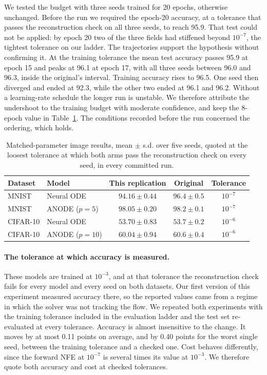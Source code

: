 We tested the budget with three seeds trained for 20 epochs, otherwise unchanged. Before the
run we required the epoch-20 accuracy, at a tolerance that passes the reconstruction check on
all three seeds, to reach 95.9. That test could not be applied: by epoch 20 two of the three
fields had stiffened beyond $10^{-7}$, the tightest tolerance on our ladder. The trajectories
support the hypothesis without confirming it. At the training tolerance the mean test accuracy
passes 95.9 at epoch 15 and peaks at 96.1 at epoch 17, with all three seeds between 96.0 and 96.3, inside the original's interval. Training accuracy
rises to 96.5. One seed then
diverged and ended at 92.3, while the other two ended at 96.1 and 96.2. Without a learning-rate
schedule the longer run is unstable. We therefore attribute the undershoot to the training
budget with moderate confidence, and keep the 8-epoch value in Table~\ref{tab:table1}. The conditions recorded before the run concerned the ordering, which holds.

\begin{table}[h]
  \centering
  \small
  \caption{Matched-parameter image results, mean $\pm$ s.d. over five seeds, quoted at the
           loosest tolerance at which both arms pass the reconstruction check on every seed,
           in every committed run.}
  \label{tab:table1}
  \begin{tabular}{@{}llccc@{}}
    \toprule
    Dataset & Model & This replication & Original & Tolerance \\
    \midrule
    MNIST    & Neural ODE & $94.16 \pm 0.44$ & $96.4 \pm 0.5$ & $10^{-7}$ \\
    MNIST    & ANODE ($p=5$)  & $98.05 \pm 0.20$ & $98.2 \pm 0.1$ & $10^{-7}$ \\
    CIFAR-10 & Neural ODE & $53.70 \pm 0.83$ & $53.7 \pm 0.2$ & $10^{-6}$ \\
    CIFAR-10 & ANODE ($p=10$) & $60.04 \pm 0.94$ & $60.6 \pm 0.4$ & $10^{-6}$ \\
    \bottomrule
  \end{tabular}
\end{table}

\paragraph{The tolerance at which accuracy is measured.}
These models are trained at $10^{-3}$, and at that tolerance the reconstruction check fails
for every model and every seed on both datasets. Our first version of this experiment measured
accuracy there, so the reported values came from a regime in which the solver was not tracking
the flow. We repeated both experiments with the training tolerance included in the evaluation
ladder and the test set re-evaluated at every tolerance. Accuracy is almost insensitive to the
change. It moves by at most 0.11 points on average, and by 0.40 points for the worst single
seed, between the training tolerance and a checked one. Cost behaves differently, since the
forward NFE at $10^{-7}$ is several times its value at $10^{-3}$. We therefore quote both
accuracy and cost at checked tolerances.

